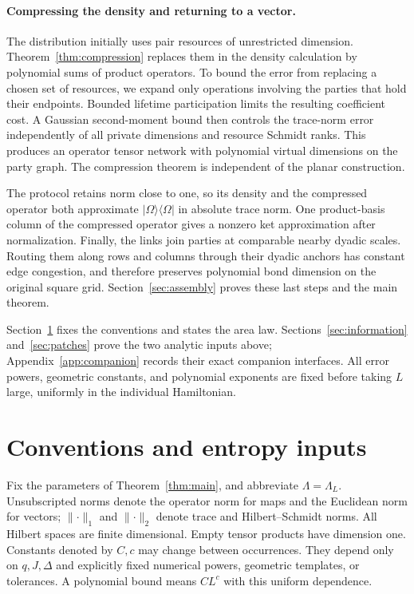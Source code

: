 \documentclass[11pt]{article}
\numberwithin{equation}{section}
\theoremstyle{definition}
\theoremstyle{remark}
\begin{document}
\paragraph{Compressing the density and returning to a vector.}
The distribution initially uses pair resources of unrestricted dimension.
Theorem~\ref{thm:compression} replaces them in the density calculation by
polynomial sums of product operators. To bound the error from
replacing a chosen set of resources, we expand only operations involving
the parties that hold their endpoints. Bounded lifetime participation
limits the resulting coefficient cost. A Gaussian
second-moment bound then controls the trace-norm error independently of
all private dimensions and resource Schmidt ranks. This produces an
operator tensor network with polynomial virtual dimensions on the party
graph. The compression theorem is independent of the planar construction.

The protocol retains norm close to one, so its density and the compressed
operator both approximate $|\Omega\rangle\langle\Omega|$ in absolute trace
norm. One product-basis column of the compressed operator gives a nonzero
ket approximation after normalization. Finally, the links join parties
at comparable nearby dyadic scales. Routing them along rows and columns
through their dyadic anchors has constant edge congestion, and therefore
preserves polynomial bond dimension on the original square grid.
Section~\ref{sec:assembly} proves these last steps and the main theorem.

Section~\ref{sec:preliminaries} fixes the conventions and states the area
law. Sections~\ref{sec:information} and~\ref{sec:patches} prove the two
analytic inputs above; Appendix~\ref{app:companion} records their exact
companion interfaces. All error powers, geometric constants, and
polynomial exponents are fixed before taking $L$ large, uniformly in the
individual Hamiltonian.

\section{Conventions and entropy inputs}\label{sec:preliminaries}

Fix the parameters of Theorem~\ref{thm:main}, and abbreviate
$\Lambda=\Lambda_L$. Unsubscripted norms denote the operator norm for maps
and the Euclidean norm for vectors; $\lVert \cdot\rVert_1$ and
$\lVert \cdot\rVert_2$ denote trace and Hilbert--Schmidt norms. All Hilbert spaces
are finite dimensional. Empty tensor products have dimension one.
Constants denoted by $C,c$ may change between occurrences. They depend only
on $q,J,\Delta$ and explicitly fixed numerical powers, geometric templates,
or tolerances. A polynomial bound means $CL^c$ with this uniform dependence.
\end{document}
